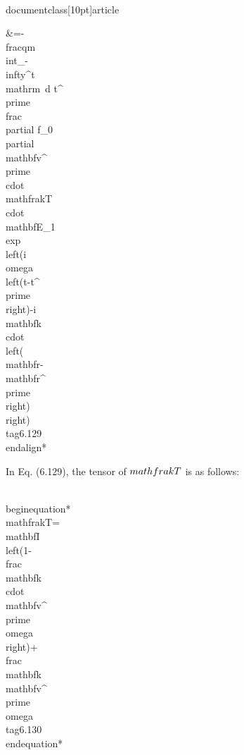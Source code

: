 \\documentclass[10pt]{article}
\begin{document}
{{{{&=-\\frac{q}{m} \\int_{-\\infty}^{t} \\mathrm{~d} t^{\\prime} \\frac{\\partial f_{0}}{\\partial \\mathbf{v}^{\\prime}} \\cdot \\mathfrak{T} \\cdot \\mathbf{E}_{1} \\exp \\left(i \\omega\\left(t-t^{\\prime}\\right)-i \\mathbf{k} \\cdot\\left(\\mathbf{r}-\\mathbf{r}^{\\prime}\\right)\\right) \\tag{6.129}
\\end{align*}


In Eq. (6.129), the tensor of $\\mathfrak{T}$ is as follows:


\\begin{equation*}
\\mathfrak{T}=\\mathbf{I}\\left(1-\\frac{\\mathbf{k} \\cdot \\mathbf{v}^{\\prime}}{\\omega}\\right)+\\frac{\\mathbf{k} \\mathbf{v}^{\\prime}}{\\omega} \\tag{6.130}
\\end{equation*}


}}}}
\end{document}
